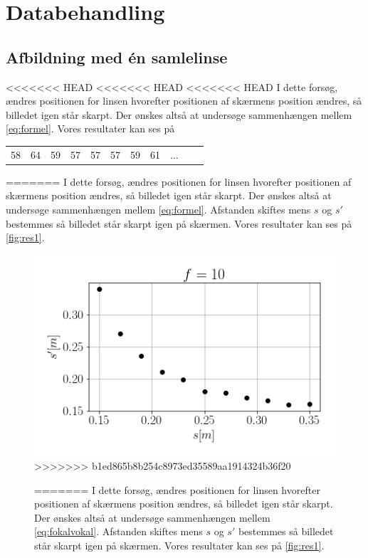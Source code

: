 \section{Databehandling}
\subsection{Afbildning med én samlelinse}
<<<<<<< HEAD
<<<<<<< HEAD
<<<<<<< HEAD
I dette forsøg, ændres positionen for linsen hvorefter positionen af skærmens position ændres, så billedet igen står skarpt. Der ønskes altså at undersøge sammenhængen mellem \cref{eq:formel}.
Vores resultater kan ses på
\begin{table}[H]
    \begin{tabular}{c|c|c|c|c|c|c|c|c|c|c}
        58 &  64 &  59 &  57 &  57 &  57  & 59  & 61  & ...
    \end{tabular}
=======
I dette forsøg, ændres positionen for linsen hvorefter positionen af skærmens position ændres, så billedet igen står skarpt. Der ønskes altså at undersøge sammenhængen mellem \cref{eq:formel}. Afstanden skiftes mens $s$ og $s'$ bestemmes så billedet står skarpt igen på skærmen.
Vores resultater kan ses på \cref{fig:res1}.
\begin{figure}[H]
    \includegraphics[width=\linewidth]{res1.png}
>>>>>>> b1ed865b8b254c8973ed35589aa1914324b36f20
    \caption{}
=======
I dette forsøg, ændres positionen for linsen hvorefter positionen af skærmens position ændres, så billedet igen står skarpt. Der ønskes altså at undersøge sammenhængen mellem \cref{eq:fokalvokal}. Afstanden skiftes mens $s$ og $s'$ bestemmes så billedet står skarpt igen på skærmen.
Vores resultater kan ses på \cref{fig:res1}.
\begin{figure}[H]

\end{figure}
\end{figure}
\end{table}
